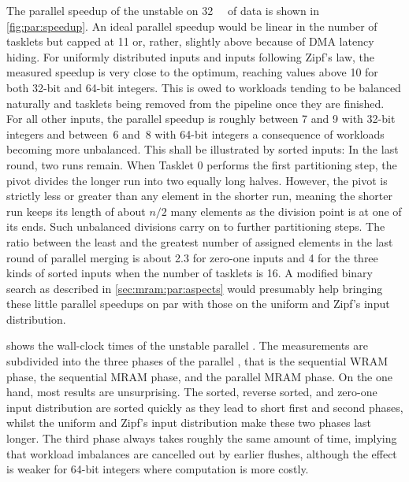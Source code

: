 The parallel speedup of the unstable \MS{} on \qty{32}{\mebi\byte} of data is shown in \cref{fig:par:speedup}.
An ideal parallel speedup would be linear in the number of tasklets but capped at 11 or, rather, slightly above because of \ac{DMA} latency hiding.
For uniformly distributed inputs and inputs following Zipf's law, the measured speedup is very close to the optimum, reaching values above 10 for both 32-bit and 64-bit integers.
This is owed to workloads tending to be balanced naturally and tasklets being removed from the pipeline once they are finished.
For all other inputs, the parallel speedup is roughly between 7 and 9 with 32-bit integers and between~6 and~8 with 64-bit integers \Dash a consequence of workloads becoming more unbalanced.
This shall be illustrated by sorted inputs:
In the last round, two runs remain.
When Tasklet 0 performs the first partitioning step, the pivot divides the longer run into two equally long halves.
However, the pivot is strictly less or greater than any element in the shorter run, meaning the shorter run keeps its length of about \(n/2\) many elements as the division point is at one of its ends.
Such unbalanced divisions carry on to further partitioning steps.
The ratio between the least and the greatest number of assigned elements in the last round of parallel merging is about 2.3 for zero-one inputs and 4 for the three kinds of sorted inputs when the number of tasklets is 16.
A modified binary search as described in \cref{sec:mram:par:aspects} would presumably help bringing these little parallel speedups on par with those on the uniform and Zipf's input distribution.

 shows the wall-clock times of the unstable parallel \MS{}.
The measurements are subdivided into the three phases of the parallel \MS{}, that is the sequential \ac{WRAM} phase, the sequential \ac{MRAM} phase, and the parallel \ac{MRAM} phase.
On the one hand, most results are unsurprising.
The sorted, reverse sorted, and zero-one input distribution are sorted quickly as they lead to short first and second phases, whilst the uniform and Zipf's input distribution make these two phases last longer.
The third phase always takes roughly the same amount of time, implying that workload imbalances are cancelled out by earlier flushes, although the effect is weaker for 64-bit integers where computation is more costly.

